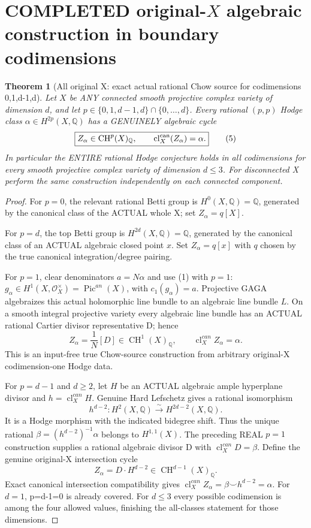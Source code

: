 \documentclass[11pt]{article}
\newcommand{\Q}{\mathbb Q}
\newcommand{\CH}{\operatorname{CH}}
\newcommand{\cl}{\operatorname{cl}}
\newtheorem{theorem}{Theorem}
\begin{document}
\section{COMPLETED original-\(X\) algebraic construction in boundary codimensions}
\begin{theorem}[All original X: exact actual rational Chow source for codimensions 0,1,d-1,d]
Let \(X\) be ANY connected smooth projective complex variety
of dimension \(d\), and let
\(p\in\{0,1,d-1,d\}\cap\{0,\dots,d\}\).
Every rational \((p,p)\) Hodge class
\(\alpha\in H^{2p}(X,\Q)\) has a
GENUINELY algebraic cycle
\[
 \boxed{
 Z_\alpha\in\CH^p(X)_\Q,\qquad
          \cl_X^{\rm can}(Z_\alpha)=\alpha.}      \tag{5}
\]
In particular the ENTIRE rational Hodge conjecture
holds in all codimensions for every smooth projective
complex variety of dimension \(d\le3\).
For disconnected X perform the same construction
independently on each connected component.
\end{theorem}
\begin{proof}
For \(p=0\), the relevant rational Betti group is
\(H^0(X,\Q)=\Q\), generated by the canonical class
of the ACTUAL whole X; set \(Z_\alpha=q[X]\).

For \(p=d\), the top Betti group is
\(H^{2d}(X,\Q)=\Q\), generated by the canonical
class of an ACTUAL algebraic closed point \(x\).
Set \(Z_\alpha=q[x]\) with \(q\) chosen by
the true canonical integration/degree pairing.

For \(p=1\), clear denominators \(a=N\alpha\)
and use (1) with \(p=1\):
\(g_\alpha\in H^1(X,\mathcal O_X^\times)
=\operatorname{Pic}^{an}(X)\), with
\(c_1(g_\alpha)=a\).
Projective GAGA algebraizes this actual holomorphic
line bundle to an algebraic line bundle \(L\).
On a smooth integral projective variety every
algebraic line bundle has an ACTUAL rational Cartier
divisor representative D; hence
\[
 Z_\alpha=\frac1N[D]\in\CH^1(X)_\Q,\qquad
 \cl_X^{can}Z_\alpha=\alpha.
\]
This is an input-free true Chow-source construction
from arbitrary original-X codimension-one Hodge data.

For \(p=d-1\) and \(d\ge2\), let \(H\) be an
ACTUAL algebraic ample hyperplane divisor
and \(h=\cl_X^{can}H\).
Genuine Hard Lefschetz gives a rational isomorphism
\[
 h^{d-2}: H^2(X,\Q)
              \xrightarrow{\;\sim\;}H^{2d-2}(X,\Q).
                                                               \tag{6}
\]
It is a Hodge morphism with the indicated bidegree shift.
Thus the unique rational \(\beta=(h^{d-2})^{-1}\alpha\)
belongs to \(H^{1,1}(X)\).
The preceding REAL \(p=1\) construction supplies
a rational algebraic divisor D with
\(\cl_X^{can}D=\beta\).
Define the genuine original-X intersection cycle
\[
 \boxed{Z_\alpha=D\cdot H^{d-2}
                      \in\CH^{d-1}(X)_\Q.}         \tag{7}
\]
Exact canonical intersection compatibility gives
\(\cl_X^{can}Z_\alpha=
 \beta\smile h^{d-2}=\alpha\).
For \(d=1\), p=d-1=0 is already covered.
For \(d\le3\) every possible codimension
is among the four allowed values, finishing
the all-classes statement for those dimensions.
\end{proof}
\end{document}
